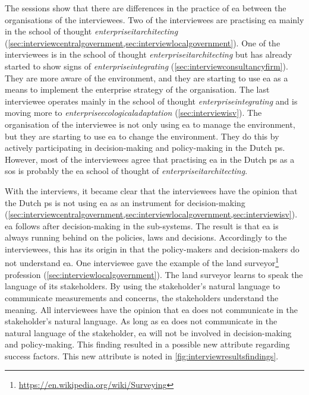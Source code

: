 The sessions show that there are differences in the practice of \gls{ea} between the organisations of the interviewees. Two of the interviewees are practising \gls{ea} mainly in the school of thought \textit{\gls{enterpriseitarchitecting}} (\cref{sec:interviewcentralgovernment,sec:interviewlocalgovernment}). One of the interviewees is in the school of thought \textit{\gls{enterpriseitarchitecting}} but has already started to show signs of \textit{\gls{enterpriseintegrating}} (\cref{sec:interviewconsultancyfirm}). They are more aware of the environment, and they are starting to use \gls{ea} as a means to implement the enterprise strategy of the organisation. The last interviewee operates mainly in the school of thought \textit{\gls{enterpriseintegrating}} and is moving more to \textit{\gls{enterpriseecologicaladaptation}} (\cref{sec:interviewisv}). The organisation of the interviewee is not only using \gls{ea} to manage the environment, but they are starting to use \gls{ea} to change the environment. They do this by actively participating in decision-making and policy-making in the Dutch \gls{ps}. However, most of the interviewees agree that practising \gls{ea} in the Dutch \gls{ps} as a \acrlong{sos} is probably the \gls{ea} school of thought of \textit{\gls{enterpriseitarchitecting}}.

With the interviews, it became clear that the interviewees have the opinion that the Dutch \gls{ps} is not using \gls{ea} as an instrument for decision-making (\cref{sec:interviewcentralgovernment,sec:interviewlocalgovernment,sec:interviewisv}). \gls{ea} follows after decision-making in the sub-systems. The result is that \gls{ea} is always running behind on the policies, laws and decisions. Accordingly to the interviewees, this has its origin in that the policy-makers and decision-makers do not understand \gls{ea}. One interviewee gave the example of the land surveyor\footnote{\url{https://en.wikipedia.org/wiki/Surveying}} profession (\cref{sec:interviewlocalgovernment}). The land surveyor learns to speak the language of its stakeholders. By using the stakeholder's natural language to communicate measurements and concerns, the stakeholders understand the meaning. All interviewees have the opinion that \gls{ea} does not communicate in the stakeholder's natural language. As long as \gls{ea} does not communicate in the natural language of the stakeholder, \gls{ea} will not be involved in decision-making and policy-making. This finding resulted in a possible new \gls{attribute} regarding success factors. This new \gls{attribute} is noted in \cref{fig:interviewresultsfindings}.
